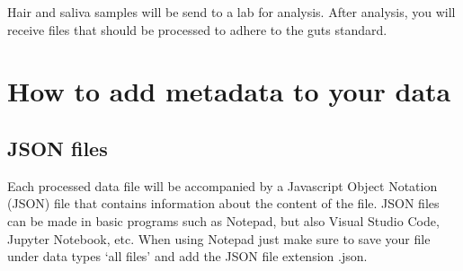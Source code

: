 \documentclass[
  letterpaper,
  DIV=11,
  numbers=noendperiod]{scrreprt}
\begin{document}
\begin{tcolorbox}[enhanced jigsaw, arc=.35mm, left=2mm, colbacktitle=quarto-callout-note-color!10!white, bottomtitle=1mm, toptitle=1mm, titlerule=0mm, leftrule=.75mm, breakable, colframe=quarto-callout-note-color-frame, colback=white, opacitybacktitle=0.6, coltitle=black, opacityback=0, rightrule=.15mm, toprule=.15mm, bottomrule=.15mm, title=\textcolor{quarto-callout-note-color}{\faInfo}\hspace{0.5em}{Biological and Genetic data}]

Hair and saliva samples will be send to a lab for analysis. After
analysis, you will receive files that should be processed to adhere to
the guts standard.

\end{tcolorbox}

\chapter{How to add metadata to your
data}\label{how-to-add-metadata-to-your-data}

\section{JSON files}\label{json-files}

Each processed data file will be accompanied by a Javascript Object
Notation (JSON) file that contains information about the content of the
file. JSON files can be made in basic programs such as Notepad, but also
Visual Studio Code, Jupyter Notebook, etc. When using Notepad just make
sure to save your file under data types `all files' and add the JSON
file extension .json.
\end{document}
